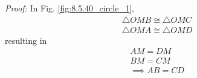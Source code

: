 \item {\em Proof: } In Fig. \ref{fig:8.5.40_circle_1}, 
\begin{align}
\triangle OMB \cong \triangle OMC
\\
\triangle OMA \cong \triangle OMD
\end{align}
resulting in 
\begin{align}
AM = DM
\\
BM = CM
\\
\implies AB = CD
\end{align}
